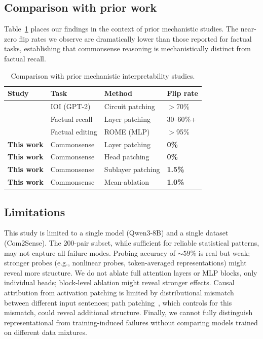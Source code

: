 \documentclass{article}
\begin{document}
\subsection{Comparison with prior work}

Table~\ref{tab:comparison} places our findings in the context of prior mechanistic studies.
The near-zero flip rates we observe are dramatically lower than those reported for factual tasks, establishing that commonsense reasoning is mechanistically distinct from factual recall.

\begin{table}[t]
\centering
\small
\caption{Comparison with prior mechanistic interpretability studies.}
\label{tab:comparison}
\begin{tabular}{llll}
\toprule
\textbf{Study} & \textbf{Task} & \textbf{Method} & \textbf{Flip rate} \\
\midrule
\citet{wang2022interpretability} & IOI (GPT-2) & Circuit patching & $>$70\% \\
\citet{geva2023dissecting} & Factual recall & Layer patching & 30--60\%+ \\
\citet{meng2022locating} & Factual editing & ROME (MLP) & $>$95\% \\
\textbf{This work} & Commonsense & Layer patching & \textbf{0\%} \\
\textbf{This work} & Commonsense & Head patching & \textbf{0\%} \\
\textbf{This work} & Commonsense & Sublayer patching & \textbf{1.5\%} \\
\textbf{This work} & Commonsense & Mean-ablation & \textbf{1.0\%} \\
\bottomrule
\end{tabular}
\end{table}

\subsection{Limitations}

This study is limited to a single model (Qwen3-8B) and a single dataset (Com2Sense).
The 200-pair subset, while sufficient for reliable statistical patterns, may not capture all failure modes.
Probing accuracy of ${\sim}59$\% is real but weak; stronger probes (e.g., nonlinear probes, token-averaged representations) might reveal more structure.
We do not ablate full attention layers or MLP blocks, only individual heads; block-level ablation might reveal stronger effects.
Causal attribution from activation patching is limited by distributional mismatch between different input sentences; path patching~\citep{conmy2023towards}, which controls for this mismatch, could reveal additional structure.
Finally, we cannot fully distinguish representational from training-induced failures without comparing models trained on different data mixtures.
\end{document}
